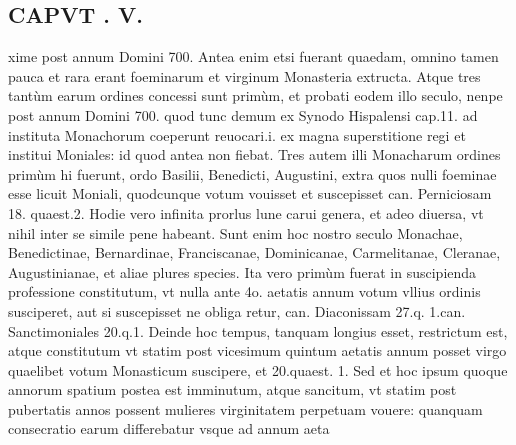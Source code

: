 \documentclass{article}
\begin{document}
\begin{pages}
\section*{CAPVT . V. }
\marginpar{[ p.293 ]}\pstart xime post annum Domini 700. Antea enim etsi fuerant quaedam, omnino tamen pauca et rara erant foeminarum et virginum Monasteria extructa. Atque tres tantùm earum ordines concessi sunt primùm, et probati eodem illo seculo, nenpe post annum Domini 700. quod tunc demum ex Synodo Hispalensi cap.11. ad instituta Monachorum coeperunt reuocari.i. ex magna superstitione regi et institui Moniales: id quod antea non fiebat. Tres autem illi Monacharum ordines primùm hi fuerunt, ordo Basilii, Benedicti, Augustini, extra quos nulli foeminae esse licuit Moniali, quodcunque  votum vouisset et suscepisset can. Perniciosam 18. quaest.2. Hodie vero infinita prorlus lune carui genera, et adeo diuersa, vt nihil inter se simile pene habeant. Sunt enim hoc nostro seculo Monachae, Benedictinae, Bernardinae, Franciscanae, Dominicanae, Carmelitanae, Cleranae, Augustinianae, et aliae plures species.  \pend\pstart Ita vero primùm fuerat in suscipienda professione constitutum, vt nulla ante 4o. aetatis annum votum vllius ordinis susciperet, aut si suscepisset ne obliga retur, can. Diaconissam 27.q. 1.can. Sanctimoniales 20.q.1. Deinde hoc tempus, tanquam longius esset, restrictum est, atque constitutum vt statim post vicesimum quintum aetatis annum posset virgo quaelibet votum Monasticum suscipere, et 20.quaest. 1. Sed et hoc ipsum quoque annorum spatium postea est imminutum, atque sancitum, vt statim post pubertatis annos possent mulieres virginitatem perpetuam vouere: quanquam consecratio earum differebatur vsque  ad annum aeta\pend

\end{pages}
\end{document}
